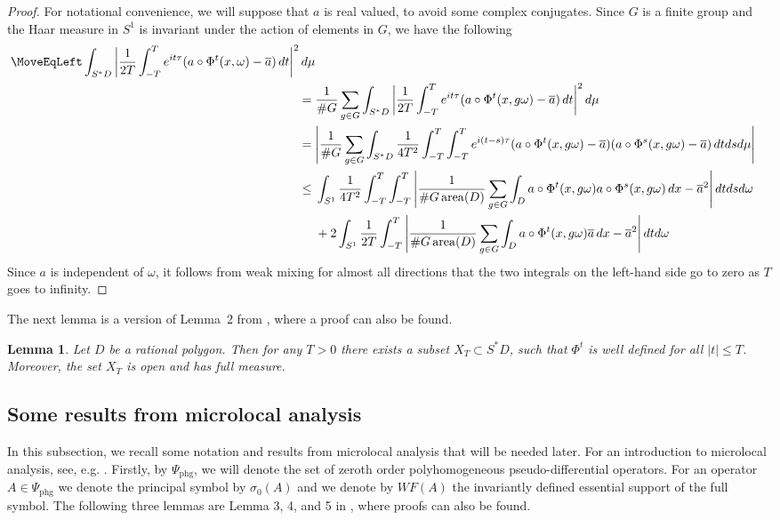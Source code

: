 \documentclass[11pt,twoside,reqno]{amsart}
\newcommand{\1}{\mathrm{\mathbf{1}}}
\DeclareMathOperator{\area}{area}
\numberwithin{equation}{section}
\theoremstyle{plain}
\newtheorem{lemma}[thm]{Lemma}
\theoremstyle{definition}
\theoremstyle{remark}
\begin{document}
\begin{proof}
For notational convenience, we will suppose that $a$ is real valued, to avoid some complex conjugates. Since $G$ is a finite group and the Haar measure in $S^1$ is invariant under the action of elements in $G$, we have the following
\begin{equation*}
    \begin{aligned}
     \MoveEqLeft \int_{S^*D} \bigg| \frac{1}{2T} \int_{-T}^{T} e^{it\tau} (  a\circ\Phi^t(x,\omega) - \overline{a}) \, dt \bigg|^2 \, d\mu 
     \\
     ={}& \frac{1}{\# G} \sum_{g\in G}\int_{S^*D} \bigg| \frac{1}{2T} \int_{-T}^{T} e^{it\tau} (  a\circ\Phi^t(x,g\omega) - \overline{a}) \, dt \bigg|^2 \, d\mu
     \\
     ={}& \Bigg| \frac{1}{\# G} \sum_{g\in G}\int_{S^*D}  \frac{1}{4T^2} \int_{-T}^{T}\int_{-T}^{T} e^{i(t-s)\tau} (  a\circ\Phi^t(x,g\omega) - \overline{a})(  a\circ\Phi^s(x,g\omega) - \overline{a}) \, dt ds d\mu \Bigg|
     \\
     \leq{}& \int_{S^1} \frac{1}{4T^2} \int_{-T}^{T}\int_{-T}^{T} \Bigg| \frac{1}{\# G \area(D)}  \sum_{g\in G} \int_D a\circ\Phi^t(x,g\omega) a\circ\Phi^s(x,g\omega) \,dx  - \overline{a}^2 \Bigg| \, dtds d\omega
     \\
     &+2 \int_{S^1} \frac{1}{2T} \int_{-T}^{T}  \Bigg| \frac{1}{\# G \area(D)} \sum_{g\in G}\int_{D}  a\circ\Phi^t(x,g\omega) \overline{a} \, dx  - \overline{a}^2 \Bigg| \, dt d\omega 
     \end{aligned}
\end{equation*}
Since $a$ is independent of $\omega$, it follows from weak mixing for almost all directions that the two integrals on the left-hand side go to zero as $T$ goes to infinity. 
\end{proof}

The next lemma is a version of Lemma~{2} from \cite{ZZ96}, where a proof can also be found. 

\begin{lemma}\label{LE:Set_for_flow}
    Let $D$ be a rational polygon. Then for any $T>0$ there exists a subset $X_T \subset S^{*}D$, such that $\Phi^t$ is well defined for all $|t|\leq T$. Moreover, the set $X_T$ is open and has full measure.
\end{lemma}

\subsection{Some results from microlocal analysis}
In this subsection, we recall some notation and results from microlocal analysis that will be needed later. For an introduction to microlocal analysis, see, e.g. \cite{MR0618463,MR2304165}. Firstly, by $\Psi_{\mathrm{phg}}$, we will denote the set of zeroth order polyhomogeneous pseudo-differential operators. For an operator $A\in \Psi_{\mathrm{phg}}$ we denote the principal symbol by $\sigma_0(A)$ and we denote by $WF(A)$ the invariantly defined essential support of the full symbol. 
The following three lemmas are Lemma {3}, {4}, and {5} in \cite{ZZ96}, where proofs can also be found.
\end{document}
